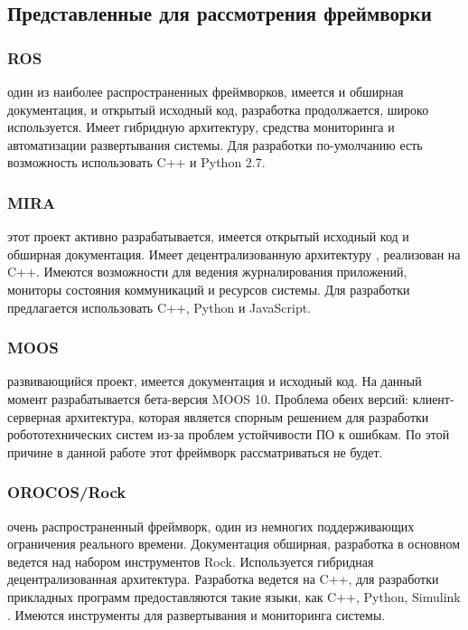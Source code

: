 \subsection{Представленные для рассмотрения фреймворки}

\subsubsection{ROS} один из наиболее распространенных фреймворков, имеется и обширная документация, и открытый исходный код, разработка продолжается, широко используется. Имеет гибридную архитектуру, средства мониторинга и автоматизации развертывания системы. Для разработки по-умолчанию есть возможность использовать C++ и Python 2.7. \cite{ros-man}

\subsubsection{MIRA} этот проект активно разрабатывается, имеется открытый исходный код и обширная документация. Имеет децентрализованную архитектуру \cite{einhorn2012mira}, реализован на C++. Имеются возможности для ведения журналирования приложений, мониторы состояния коммуникаций и ресурсов системы. Для разработки предлагается использовать C++, Python и JavaScript. \cite{mira-man}

\subsubsection{MOOS} развивающийся проект, имеется документация и исходный код. На данный момент разрабатывается бета-версия MOOS 10. Проблема обеих версий: клиент-серверная архитектура, которая является спорным решением для разработки робототехнических систем из-за проблем устойчивости ПО к ошибкам. По этой причине в данной работе этот фреймворк рассматриваться не будет. \cite{moos-man}

\subsubsection{OROCOS/Rock} очень распространенный фреймворк, один из немногих поддерживающих ограничения реального времени. Документация обширная, разработка в основном ведется над набором инструментов Rock. Используется гибридная децентрализованная архитектура. Разработка ведется на C++, для разработки прикладных программ предоставляются такие языки, как C++, Python, Simulink \cite{blasco2012multiagent}. Имеются инструменты для развертывания и мониторинга системы. \cite{orocos-man,rock-man}


